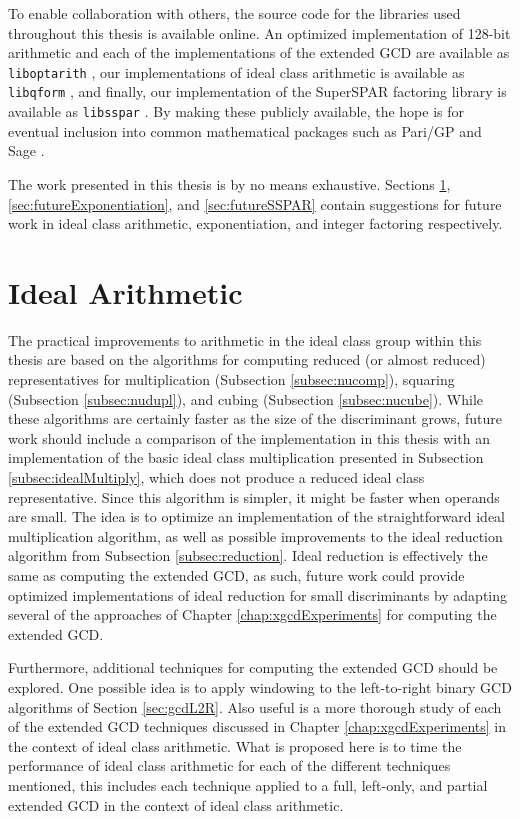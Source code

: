 \documentclass{ucalgthes1}
\theoremstyle{definition}
\begin{document}
To enable collaboration with others, the source code for the libraries used throughout this thesis is available online.  An optimized implementation of 128-bit arithmetic and each of the implementations of the extended GCD are available as \texttt{liboptarith} \cite{liboptarith}, our implementations of ideal class arithmetic is available as \texttt{libqform} \cite{libqform}, and finally, our implementation of the SuperSPAR factoring library is available as \texttt{libsspar} \cite{libsspar}.   By making these publicly available, the hope is for eventual inclusion into common mathematical packages such as Pari/GP \cite{PariGP} and Sage \cite{Sage}.

The work presented in this thesis is by no means exhaustive.  Sections \ref{sec:futureIdealArithmetic}, \ref{sec:futureExponentiation}, and \ref{sec:futureSSPAR} contain suggestions for future work in ideal class arithmetic, exponentiation, and integer factoring respectively.

\section{Ideal Arithmetic}
\label{sec:futureIdealArithmetic}

The practical improvements to arithmetic in the ideal class group within this thesis are based on the algorithms for computing reduced (or almost reduced) representatives for multiplication (Subsection \ref{subsec:nucomp}), squaring (Subsection \ref{subsec:nudupl}), and cubing (Subsection \ref{subsec:nucube}).  While these algorithms are certainly faster as the size of the discriminant grows, future work should include a comparison of the implementation in this thesis with an implementation of the basic ideal class multiplication presented in Subsection \ref{subsec:idealMultiply}, which does not produce a reduced ideal class representative.  Since this algorithm is simpler, it might be faster when operands are small.  The idea is to optimize an implementation of the straightforward ideal multiplication algorithm, as well as possible improvements to the ideal reduction algorithm from Subsection \ref{subsec:reduction}.  Ideal reduction is effectively the same as computing the extended GCD, as such, future work could provide optimized implementations of ideal reduction for small discriminants by adapting several of the approaches of Chapter \ref{chap:xgcdExperiments} for computing the extended GCD.

Furthermore, additional techniques for computing the extended GCD should be explored.  One possible idea is to apply windowing to the left-to-right binary GCD algorithms of Section \ref{sec:gcdL2R}.  Also useful is a more thorough study of each of the extended GCD techniques discussed in Chapter \ref{chap:xgcdExperiments} in the context of ideal class arithmetic.  What is proposed here is to time the performance of ideal class arithmetic for each of the different techniques mentioned, this includes each technique applied to a full, left-only, and partial extended GCD in the context of ideal class arithmetic.
\end{document}
